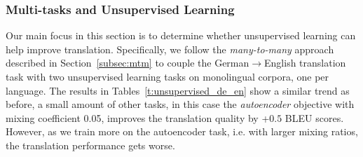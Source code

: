 \subsubsection{Multi-tasks and Unsupervised Learning}
Our main focus in this section is to determine whether unsupervised
learning can help improve translation. Specifically, we follow the {\it
many-to-many} approach described in Section~\ref{subsec:mtm} to couple
the German$\rightarrow$English translation task with two unsupervised learning
tasks on monolingual corpora, one per language.
The results in Tables~\ref{t:unsupervised_de_en} show a similar trend as before,
a small amount of other tasks, in this case the {\it autoencoder} objective with
mixing coefficient 0.05, improves the translation quality by +$0.5$ BLEU
scores. However, as we train more on the 
autoencoder task, i.e. with larger mixing ratios, the translation performance gets worse. 

